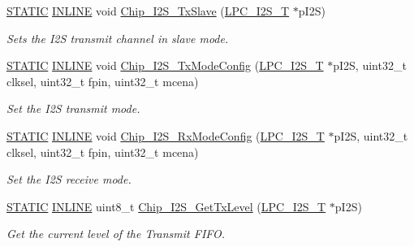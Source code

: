 \begin{DoxyCompactItemize}
\hyperlink{group___l_p_c___types___public___macros_ga10b2d890d871e1489bb02b7e70d9bdfb}{S\+T\+A\+T\+IC} \hyperlink{spifi__18xx__43xx_8h_a2eb6f9e0395b47b8d5e3eeae4fe0c116}{I\+N\+L\+I\+NE} void \hyperlink{group___i2_s__18_x_x__43_x_x_gae9f1791ca07fb3672d2f2c379f437f3c}{Chip\+\_\+\+I2\+S\+\_\+\+Tx\+Slave} (\hyperlink{struct_l_p_c___i2_s___t}{L\+P\+C\+\_\+\+I2\+S\+\_\+T} $\ast$p\+I2S)
\begin{DoxyCompactList}\small\item\em Sets the I2S transmit channel in slave mode. \end{DoxyCompactList}\item 
\hyperlink{group___l_p_c___types___public___macros_ga10b2d890d871e1489bb02b7e70d9bdfb}{S\+T\+A\+T\+IC} \hyperlink{spifi__18xx__43xx_8h_a2eb6f9e0395b47b8d5e3eeae4fe0c116}{I\+N\+L\+I\+NE} void \hyperlink{group___i2_s__18_x_x__43_x_x_ga0c7a808e84e2c0a3f7ffbba089c7d380}{Chip\+\_\+\+I2\+S\+\_\+\+Tx\+Mode\+Config} (\hyperlink{struct_l_p_c___i2_s___t}{L\+P\+C\+\_\+\+I2\+S\+\_\+T} $\ast$p\+I2S, uint32\+\_\+t clksel, uint32\+\_\+t fpin, uint32\+\_\+t mcena)
\begin{DoxyCompactList}\small\item\em Set the I2S transmit mode. \end{DoxyCompactList}\item 
\hyperlink{group___l_p_c___types___public___macros_ga10b2d890d871e1489bb02b7e70d9bdfb}{S\+T\+A\+T\+IC} \hyperlink{spifi__18xx__43xx_8h_a2eb6f9e0395b47b8d5e3eeae4fe0c116}{I\+N\+L\+I\+NE} void \hyperlink{group___i2_s__18_x_x__43_x_x_gae4e5e39c6ea22b2be42c91bdaa0f27e8}{Chip\+\_\+\+I2\+S\+\_\+\+Rx\+Mode\+Config} (\hyperlink{struct_l_p_c___i2_s___t}{L\+P\+C\+\_\+\+I2\+S\+\_\+T} $\ast$p\+I2S, uint32\+\_\+t clksel, uint32\+\_\+t fpin, uint32\+\_\+t mcena)
\begin{DoxyCompactList}\small\item\em Set the I2S receive mode. \end{DoxyCompactList}\item 
\hyperlink{group___l_p_c___types___public___macros_ga10b2d890d871e1489bb02b7e70d9bdfb}{S\+T\+A\+T\+IC} \hyperlink{spifi__18xx__43xx_8h_a2eb6f9e0395b47b8d5e3eeae4fe0c116}{I\+N\+L\+I\+NE} uint8\+\_\+t \hyperlink{group___i2_s__18_x_x__43_x_x_ga125559c7f810a2564f5b6059ead42256}{Chip\+\_\+\+I2\+S\+\_\+\+Get\+Tx\+Level} (\hyperlink{struct_l_p_c___i2_s___t}{L\+P\+C\+\_\+\+I2\+S\+\_\+T} $\ast$p\+I2S)
\begin{DoxyCompactList}\small\item\em Get the current level of the Transmit F\+I\+FO. \end{DoxyCompactList}\item 

\end{DoxyCompactItemize}
